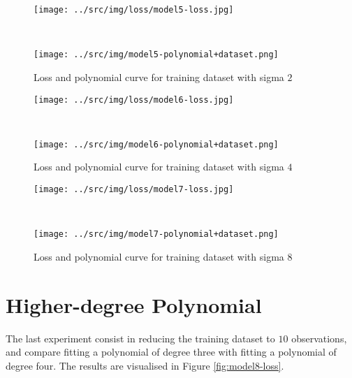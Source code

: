\documentclass[a4paper,12pt]{article} %
\begin{document}
	\begin{figure}[H]
		\begin{minipage}[t]{.45\textwidth}
			\centering
			\texttt{[image: ../src/img/loss/model5-loss.jpg]}
		\end{minipage}
		~
		\begin{minipage}[t]{.45\textwidth}
			\centering
			\texttt{[image: ../src/img/model5-polynomial+dataset.png]}
		\end{minipage}
		\caption{Loss and polynomial curve for training dataset with sigma $2$}
	\end{figure}
	
	\begin{figure}[H]
		\begin{minipage}[t]{.45\textwidth}
			\centering
			\texttt{[image: ../src/img/loss/model6-loss.jpg]}
		\end{minipage}
		~
		\begin{minipage}[t]{.45\textwidth}
			\centering
			\texttt{[image: ../src/img/model6-polynomial+dataset.png]}
		\end{minipage}
	\caption{Loss and polynomial curve for training dataset with sigma $4$}
	\end{figure}
	
	\begin{figure}[H]
		\begin{minipage}[t]{.45\textwidth}
			\centering
			\texttt{[image: ../src/img/loss/model7-loss.jpg]}
		\end{minipage}
		~
		\begin{minipage}[t]{.45\textwidth}
			\centering
			\texttt{[image: ../src/img/model7-polynomial+dataset.png]}
		\end{minipage}
	\caption{Loss and polynomial curve for training dataset with sigma $8$}
	\end{figure}
	
	
	\section{Higher-degree Polynomial}
	The last experiment consist in reducing the training dataset to $10$ 
	observations, and compare fitting a polynomial of degree three with fitting 
	a polynomial of degree four.
	The results are visualised in Figure \ref*{fig:model8-loss}.
	
\end{document}
